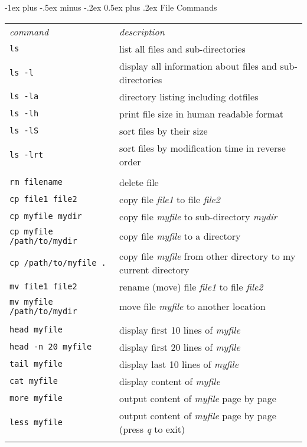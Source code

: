 \documentclass[10pt,landscape]{article}
\makeatletter
\renewcommand{\section}{\@startsection{section}{1}{0mm}%
                                {-1ex plus -.5ex minus -.2ex}%
                                {0.5ex plus .2ex}%
                                {\normalfont\large\bfseries}}
\makeatother
\begin{document}
\begin{multicols}{2}
\section{File Commands}
\begin{tabular}{ll}
\emph{command} & \emph{description} \\

\verb!ls! & list all files and sub-directories\\
\texttt{ls -l} & display all information about files and sub-directories\\
\texttt{ls -la} & directory listing including dotfiles\\
\texttt{ls -lh} & print file size in human readable format\\
\texttt{ls -lS} & sort files by their size\\
\texttt{ls -lrt} & sort files by modification time in reverse order\\\\
\texttt{rm filename} & delete file\\
\texttt{cp file1 file2} & copy file \textit{file1} to file \textit{file2}\\
\texttt{cp myfile mydir} & copy file \textit{myfile} to sub-directory \textit{mydir}\\
\texttt{cp myfile /path/to/mydir} & copy file \textit{myfile} to a directory\\
\texttt{cp /path/to/myfile  .} & copy file \textit{myfile} from other directory to my current directory\\
\texttt{mv file1 file2} & rename (move) file \textit{file1} to file \textit{file2}\\
\texttt{mv myfile /path/to/mydir} & move file \textit{myfile} to another location\\\\
\texttt{head myfile} & display first 10 lines of  \textit{myfile} \\
\texttt{head -n 20 myfile} & display first 20 lines of  \textit{myfile} \\
\texttt{tail myfile} & display last 10 lines of  \textit{myfile} \\
\texttt{cat myfile} & display content of  \textit{myfile} \\
\texttt{more myfile} & output content of \textit{myfile} page by page \\
\texttt{less myfile} & output content of \textit{myfile} page by page (press \textit{q} to exit)\\\\

\end{tabular}
\end{multicols}
\end{document}
